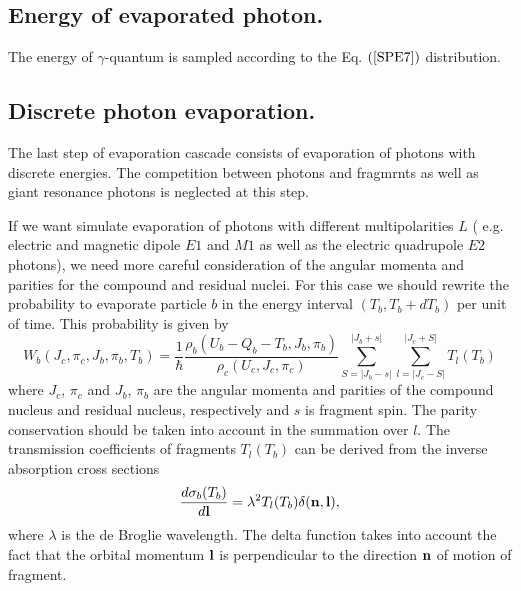 \subsection{Energy of evaporated photon.}
\hspace{1.0em}The energy of $\gamma$-quantum is sampled 
according to the Eq. $(\ref{SPE7})$
distribution.

\subsection{Discrete photon evaporation.}

\hspace{1.0em} The last step of evaporation cascade consists of evaporation of 
photons with discrete energies. The competition between photons and 
fragmrnts as well as giant resonance photons is neglected at this step. 

If we want simulate evaporation of photons with 
different multipolarities $L$ ( e.g. electric and magnetic dipole $E1$ and 
$M1$ as well as the electric quadrupole $E2$ photons),
 we need more careful consideration of  
the angular momenta and parities for the compound and residual nuclei. 
For this case we should rewrite the 
probability to evaporate  particle
$b$ in the energy interval $(T_b, T_b+dT_b)$ per unit of time. 
This probability
 is given by \cite{IKP94}  
\begin{equation}
\label{SPE1}W_b (J_c, \pi_c,J_b,\pi_b,T_b)=\frac 1\hbar
\frac{\rho_b (U_b-Q_b-T_b,J_b,\pi_b)}{\rho_c (U_c,J_c, \pi_c)%
}\sum_{S=|J_b-s|}^{|J_b+s|}\sum_{l=|J_c-S|}^{|J_c+S|}T_l(T_b) 
\end{equation}
where $J_c$, $\pi_c$ and $J_b$, $\pi_b$ are the angular momenta and 
parities of the compound nucleus and 
 residual
nucleus, respectively and $s$ is fragment spin. 
The parity 
conservation should be taken into account in the summation over $l$.
   The transmission coefficients
of fragments $T_l(T_b)$ can be derived 
from the inverse absorption cross sections 
\cite{IKP94} 
\begin{equation}
\label{SPE2} \frac{d\sigma_b(T_b)}{d\bf{l}}=\lambda^2
T_l(T_b)\delta(\bf{n},\bf{l}),
\end{equation}
where $\lambda$ is the de Broglie wavelength. The 
delta function takes into 
account the fact that the orbital momentum $\bf{l}$ is perpendicular 
to the direction $\bf{n}$ of motion of fragment.

